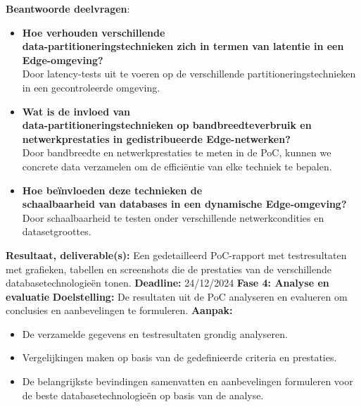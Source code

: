     \textbf{Beantwoorde deelvragen}:
    \begin{itemize}
    \item \textbf{Hoe verhouden verschillende \vspace{0em}\\ data-partitioneringstechnieken zich in termen van latentie in een Edge-omgeving?} \\
      Door latency-tests uit te voeren op de verschillende partitioneringstechnieken in een gecontroleerde omgeving.
    \item \textbf{Wat is de invloed van \vspace{0em}\\ data-partitioneringstechnieken op bandbreedteverbruik en netwerkprestaties in gedistribueerde Edge-netwerken?} \\
      Door bandbreedte en netwerkprestaties te meten in de PoC, kunnen we concrete data verzamelen om de efficiëntie van elke techniek te bepalen.
    \item \textbf{Hoe beïnvloeden deze technieken de \vspace{0em}\\ schaalbaarheid van databases in een dynamische Edge-omgeving?} \\
      Door schaalbaarheid te testen onder verschillende netwerkcondities en datasetgroottes.
    \end{itemize}
    \textbf{Resultaat, deliverable(s):} Een gedetailleerd PoC-rapport met testresultaten met grafieken, tabellen en screenshots die de prestaties van de verschillende databasetechnologieën tonen.\newline\newline
    \textbf{Deadline:} 24/12/2024\newline\newline
\textbf{Fase 4: Analyse en evaluatie}\newline\newline
    \textbf{Doelstelling:} De resultaten uit de PoC analyseren en evalueren om conclusies en aanbevelingen te formuleren.\newline\newline
    \textbf{Aanpak:}
    \begin{itemize}
        \item De verzamelde gegevens en testresultaten grondig analyseren.
        \item Vergelijkingen maken op basis van de gedefinieerde criteria en prestaties.
        \item De belangrijkste bevindingen samenvatten en aanbevelingen formuleren voor de beste databasetechnologieën op basis van de analyse.\newline
    \end{itemize}
